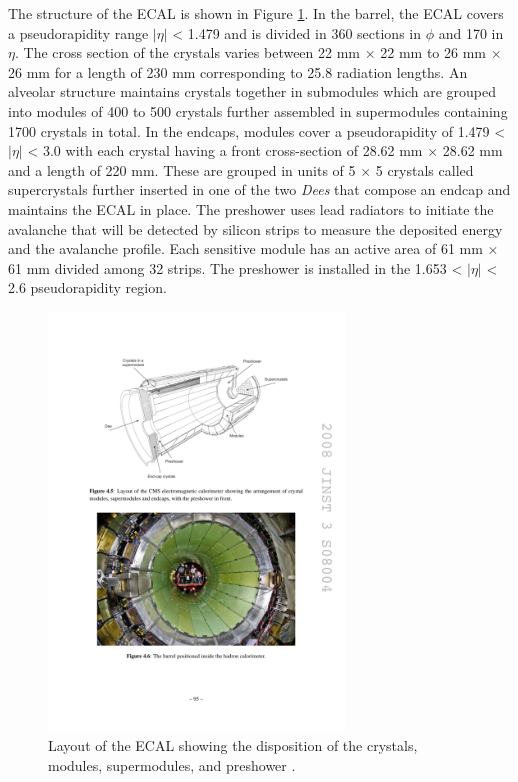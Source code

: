     The structure of the ECAL is shown in Figure \ref{fig:I-3-ecal}. In the barrel, the ECAL covers a pseudorapidity range $ | \eta | $ < 1.479 and is divided in 360 sections in $ \phi $ and 170 in $ \eta $. The cross section of the crystals varies between 22 mm $ \times $ 22 mm to 26 mm $ \times $ 26 mm for a length of 230 mm corresponding to 25.8 radiation lengths. An alveolar structure maintains crystals together in submodules which are grouped into modules of 400 to 500 crystals further assembled in supermodules containing 1700 crystals in total. In the endcaps, modules cover a pseudorapidity of 1.479 < $ | \eta | $ < 3.0 with each crystal having a front cross-section of 28.62 mm $ \times $ 28.62 mm and a length of 220 mm. These are grouped in units of 5 $ \times $ 5 crystals called supercrystals further inserted in one of the two \emph{Dees} that compose an endcap and maintains the ECAL in place. The preshower uses lead radiators to initiate the avalanche that will be detected by silicon strips to measure the deposited energy and the avalanche profile. Each sensitive module has an active area of 61 mm $\times$ 61 mm divided among 32 strips. The preshower is installed in the 1.653 < $ | \eta | $ < 2.6 pseudorapidity region. \\

    \begin{figure}[t!]
      \centering
      \includegraphics[width=0.7\textwidth]{img/I-3-cms/ecal.pdf}
      \caption{Layout of the ECAL showing the disposition of the crystals, modules, supermodules, and preshower \cite{1748-0221-3-08-S08004}.}
      \label{fig:I-3-ecal}
    \end{figure}

